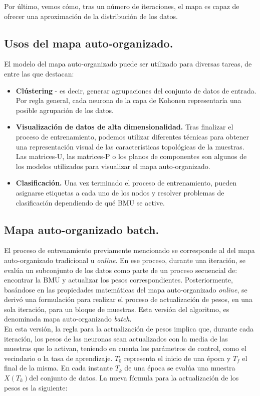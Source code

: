 Por último, vemos cómo, tras un número de iteraciones, el mapa es capaz de ofrecer una aproximación de la distribución de los datos.
\subsection{Usos del mapa auto-organizado.}
El modelo del mapa auto-organizado puede ser utilizado para diversas tareas, de entre las que destacan:\\

\begin{itemize}
	\item \textbf{Clústering} - es decir, generar agrupaciones del conjunto de datos de entrada. Por regla general, cada neurona de la capa de Kohonen representaría una posible agrupación de los datos. 

	\item \textbf{Visualización de datos de alta dimensionalidad.} Tras finalizar el proceso de entrenamiento, podemos utilizar diferentes técnicas para obtener una representación visual de las características topológicas de la muestras. Las matrices-U, las matrices-P o los planos de componentes son algunos de los modelos utilizados para visualizar el mapa auto-organizado.

	\item \textbf{Clasificación.} Una vez terminado el proceso de entrenamiento, pueden asignarse etiquetas a cada uno de los nodos y resolver problemas de clasificación dependiendo de qué BMU se active. 
	\end{itemize}

\subsection{Mapa auto-organizado batch.}
El proceso de entrenamiento previamente mencionado se corresponde al del mapa auto-organizado tradicional u \textit{online}. En ese proceso, durante una iteración, se evalúa un subconjunto de los datos como parte de un proceso secuencial de: encontrar la BMU y actualizar los pesos correspondientes. Posteriormente, basándose en las propiedades matemáticas del mapa auto-organizado \textit{online}, se derivó una formulación para realizar el proceso de actualización de pesos, en una sola iteración, para un bloque de muestras. Esta versión del algoritmo, es denominada mapa auto-organizado \textit{batch}. \\

En esta versión, la regla para la actualización de pesos implica que, durante cada iteración, los pesos de las neuronas sean actualizados con la media de las muestras que lo activan, teniendo en cuenta los parámetros de control, como el vecindario o la tasa de aprendizaje. $T_0$ representa el inicio de una época y $T_f$ el final de la misma. En cada instante $T_k$ de una época se evalúa una muestra $X(T_k) $del conjunto de datos. La nueva fórmula para la actualización de los pesos es la siguiente:\\

